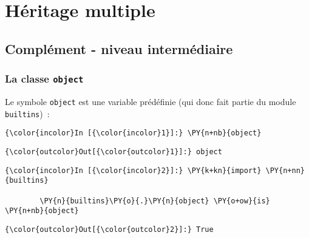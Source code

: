     
    
    
    

    

    \hypertarget{huxe9ritage-multiple}{%
\section{Héritage multiple}\label{huxe9ritage-multiple}}

    \hypertarget{compluxe9ment---niveau-intermuxe9diaire}{%
\subsection{Complément - niveau
intermédiaire}\label{compluxe9ment---niveau-intermuxe9diaire}}

    \hypertarget{la-classe-object}{%
\subsubsection{\texorpdfstring{La classe
\texttt{object}}{La classe object}}\label{la-classe-object}}

    Le symbole \texttt{object} est une variable prédéfinie (qui donc fait
partie du module \texttt{builtins})~:

    \begin{Verbatim}[commandchars=\\\{\},frame=single,framerule=0.3mm,rulecolor=\color{cellframecolor}]
{\color{incolor}In [{\color{incolor}1}]:} \PY{n+nb}{object}
\end{Verbatim}


\begin{Verbatim}[commandchars=\\\{\},frame=single,framerule=0.3mm,rulecolor=\color{cellframecolor}]
{\color{outcolor}Out[{\color{outcolor}1}]:} object
\end{Verbatim}
            
    \begin{Verbatim}[commandchars=\\\{\},frame=single,framerule=0.3mm,rulecolor=\color{cellframecolor}]
{\color{incolor}In [{\color{incolor}2}]:} \PY{k+kn}{import} \PY{n+nn}{builtins}
        
        \PY{n}{builtins}\PY{o}{.}\PY{n}{object} \PY{o+ow}{is} \PY{n+nb}{object}
\end{Verbatim}


\begin{Verbatim}[commandchars=\\\{\},frame=single,framerule=0.3mm,rulecolor=\color{cellframecolor}]
{\color{outcolor}Out[{\color{outcolor}2}]:} True
\end{Verbatim}
            
